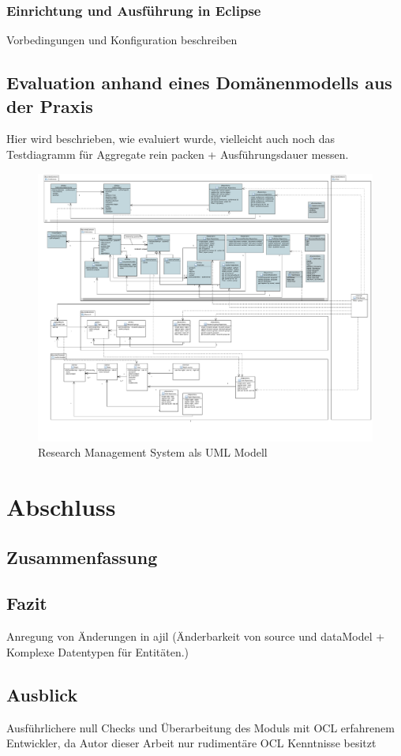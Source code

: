 \documentclass[
	oneside,  %
	ngerman, 
	final, 
	11pt, 
	a4paper, 
	1.1headlines, 
	headinclude=false, 
	footinclude=false, 
	mpinclude=false, 
	pagesize, 
	onecolumn, 
	titlepage, 
	parskip=half, 
	headsepline, 
	chapterprefix=false, 
	version=first, 
	listof=totoc, 
	bibliography=totoc, 
	toc=graduated, 
	fleqn
]{scrbook}
\begin{document}
\subsection{Einrichtung und Ausführung in Eclipse}
Vorbedingungen und Konfiguration beschreiben
\section{Evaluation anhand eines Domänenmodells aus der Praxis}
Hier wird beschrieben, wie evaluiert wurde, vielleicht auch noch das Testdiagramm für Aggregate rein packen + Ausführungsdauer messen.
\begin{figure}
\includegraphics[width=\textwidth]{Bilder/rms_diagram.pdf}
\caption{Research Management System als UML Modell}
\end{figure}
\chapter{Abschluss}
\label{chap:zusammenfassung}
\section{Zusammenfassung}
\section{Fazit}
Anregung von Änderungen in ajil (Änderbarkeit von source und dataModel + Komplexe Datentypen für Entitäten.)
\section{Ausblick}
Ausführlichere null Checks und Überarbeitung des Moduls mit OCL erfahrenem Entwickler, da Autor dieser Arbeit nur rudimentäre OCL Kenntnisse besitzt
\end{document}
